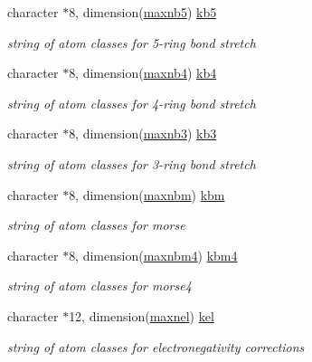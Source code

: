 \begin{DoxyCompactItemize}
character $\ast$8, dimension(\hyperlink{classkbonds_ac0a19701e66f2ba2a514010e46f3e21f}{maxnb5}) \hyperlink{classkbonds_a36d4806e8cea51b4ee028732e8b0fe49}{kb5}
\begin{DoxyCompactList}\small\item\em string of atom classes for 5-\/ring bond stretch \end{DoxyCompactList}\item 
character $\ast$8, dimension(\hyperlink{classkbonds_a1146d8cd8643971889024141fc7b1278}{maxnb4}) \hyperlink{classkbonds_ab434179eab14e342f2414151414e63b7}{kb4}
\begin{DoxyCompactList}\small\item\em string of atom classes for 4-\/ring bond stretch \end{DoxyCompactList}\item 
character $\ast$8, dimension(\hyperlink{classkbonds_aa8e2e75495d2bb801b4ee3410c933ba1}{maxnb3}) \hyperlink{classkbonds_ad70e37dfe5398cf66dfaa94a974270c5}{kb3}
\begin{DoxyCompactList}\small\item\em string of atom classes for 3-\/ring bond stretch \end{DoxyCompactList}\item 
character $\ast$8, dimension(\hyperlink{classkbonds_a479b8df9e16642b87303fc1f3bd06d26}{maxnbm}) \hyperlink{classkbonds_ad0be67fdca802054468f33bcf5a0e7cd}{kbm}
\begin{DoxyCompactList}\small\item\em string of atom classes for morse \end{DoxyCompactList}\item 
character $\ast$8, dimension(\hyperlink{classkbonds_a7722f5df93f05ffe051844b4b14fa9de}{maxnbm4}) \hyperlink{classkbonds_a492d22e1290bde1d49114a7d3813342d}{kbm4}
\begin{DoxyCompactList}\small\item\em string of atom classes for morse4 \end{DoxyCompactList}\item 
character $\ast$12, dimension(\hyperlink{classkbonds_a6db85c30f12f7ced42381f0176090d23}{maxnel}) \hyperlink{classkbonds_a0a98345c9da9fa5108362b927e79036c}{kel}
\begin{DoxyCompactList}\small\item\em string of atom classes for electronegativity corrections \end{DoxyCompactList}\end{DoxyCompactItemize}


